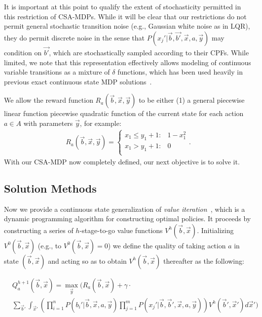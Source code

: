 It is important at this point to qualify the extent of stochasticity
permitted in this restriction of CSA-MDPs.  While it will be clear
that our restrictions do not permit general stochastic transition noise
(e.g., Gaussian white noise as in LQR), they do permit discrete noise
in the sense that $P(x_j'|\vec{b},\vec{b'},\vec{x},a,\vec{y})$
may condition on $\vec{b'}$, which are stochastically sampled according
to their CPFs.  While limited, 
we note that this representation effectively allows modeling of
continuous variable transitions as a mixture of $\delta$ functions,
which has been used heavily in previous exact continuous state MDP 
solutions~\cite{feng04,hao09}.


We allow the reward function $R_a(\vec{b},\vec{x},\vec{y})$ to be either
(1) a general piecewise linear function 
piecewise quadratic function of the current state for each action $a
\in A$ with parameters $\vec{y}$, for example:
\begin{align}
R_a(\vec{b},\vec{x},\vec{y}) = \begin{cases}
x_1 \leq y_1 + 1 : & 1 - x_1^2 \\
x_1 > y_1 + 1:     & 0 \\
\end{cases}. \label{eq:simple_reward}
\end{align}
With our CSA-MDP now completely defined, our next objective
is to solve it.

\subsection{Solution Methods}

\label{sec:soln}

Now we provide a continuous state generalization of {\it
value iteration}~\cite{bellman}, which is a dynamic programming
algorithm for constructing optimal policies.  It proceeds by
constructing a series of $h$-stage-to-go value functions
$V^h(\vec{b},\vec{x})$.  Initializing $V^0(\vec{b},\vec{x})$ 
(e.g., to $V^0(\vec{b},\vec{x}) = 0$) 
we define the quality of taking action $a$ in state
$(\vec{b},\vec{x})$ and acting so as to obtain $V^{h}(\vec{b},\vec{x})$ 
thereafter as the following:
\vspace{-3mm}

{\footnotesize
\begin{align}
& Q_a^{h+1}(\vec{b},\vec{x}) = \max_{\vec{y}} \Bigg( R_a(\vec{b},\vec{x}) + \gamma \cdot \label{eq:qfun} \\ 
& \sum_{\vec{b}'} \int_{\vec{x}'} \left( \prod_{i=1}^n P(b_i'|\vec{b},\vec{x},a,\vec{y}) \prod_{j=1}^m P(x_j'|\vec{b},\vec{b}',\vec{x},a,\vec{y}) \right) V^h(\vec{b}',\vec{x}') d\vec{x}' \Bigg) \nonumber
\end{align}}

